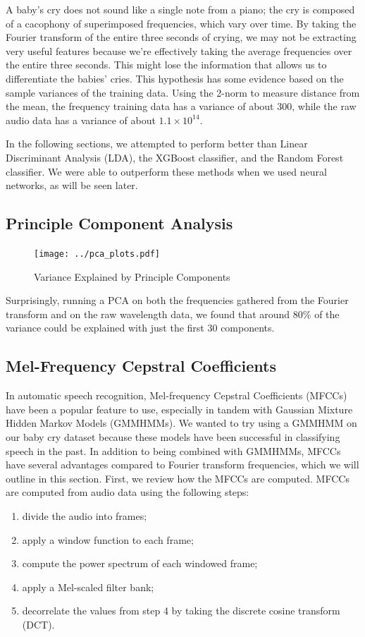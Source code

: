 \documentclass[11pt]{article}
\begin{document}
A baby's cry does not sound like a single note from a piano; the cry is composed of a cacophony of superimposed frequencies, which vary over time.
By taking the Fourier transform of the entire three seconds of crying, we may not be extracting very useful features because we're effectively taking the average frequencies over the entire three seconds.
This might lose the information that allows us to differentiate the babies' cries.
This hypothesis has some evidence based on the sample variances of the training data.
Using the 2-norm to measure distance from the mean, the frequency training data has a variance of about $ 300 $, while the raw audio data has a variance of about $ 1.1 \times 10^{14} $.

In the following sections, we attempted to perform better than Linear Discriminant Analysis (LDA), the XGBoost classifier, and the Random Forest classifier.
We were able to outperform these methods when we used neural networks, as will be seen later.

\subsection{Principle Component Analysis}
\begin{figure}[!htb]
\begin{center}
   \texttt{[image: ../pca\_plots.pdf]}
   \caption{Variance Explained by Principle Components}
\end{center}
\end{figure}

Surprisingly, running a PCA on both the frequencies gathered from the Fourier transform and on the raw wavelength data, we found that around 80\% of the variance could be explained with just the first 30 components.


\subsection{Mel-Frequency Cepstral Coefficients}
In automatic speech recognition, Mel-frequency Cepstral Coefficients (MFCCs) have been a popular feature to use, especially in tandem with Gaussian Mixture Hidden Markov Models (GMMHMMs).
We wanted to try using a GMMHMM on our baby cry dataset because these models have been successful in classifying speech in the past.
In addition to being combined with GMMHMMs, MFCCs have several advantages compared to Fourier transform frequencies, which we will outline in this section.
First, we review how the MFCCs are computed.
MFCCs are computed from audio data using the following steps:
\begin{enumerate}
   \item divide the audio into frames;
   \item apply a window function to each frame;
   \item compute the power spectrum of each windowed frame;
   \item apply a Mel-scaled filter bank;
   \item decorrelate the values from step 4 by taking the discrete cosine transform (DCT).
\end{enumerate}
\end{document}
